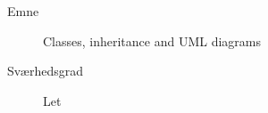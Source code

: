 \begin{description}
\item[Emne] Classes, inheritance and UML diagrams
\item[Sværhedsgrad] Let
\end{description}
